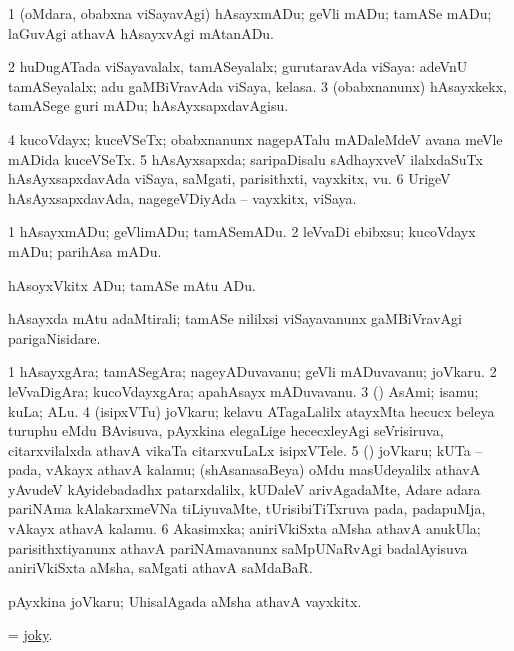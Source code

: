 \noindent
\gl{\pagu}
\bmng
\bnum
\num{1}    (oMdara, obabxna viSayavAgi) hAsayxmADu; geVli mADu; tamASe mADu; laGuvAgi athavA hAsayxvAgi mAtanADu. 
\num{2}   huDugATada viSayavalalx, tamASeyalalx; gurutaravAda viSaya:   adeVnU tamASeyalalx; adu gaMBiVravAda viSaya, kelasa. 
\num{3}  (obabxnanunx) hAsayxkekx, tamASege guri mADu; hAsAyxsapxdavAgisu. 
\num{4}   kucoVdayx; kuceVSeTx; obabxnanunx nagepATalu mADaleMdeV avana meVle mADida kuceVSeTx. 
\num{5}  hAsAyxsapxda; saripaDisalu sAdhayxveV ilalxdaSuTx hAsAyxsapxdavAda viSaya, saMgati, parisithxti, vayxkitx, \mo vu. 
\num{6}    UrigeV hAsAyxsapxdavAda, nagegeVDiyAda -- vayxkitx, viSaya. 
\enum
\emng
\eentry

\bentry
{}
\gl{\sakirx}
\bmng
\bnum
\num{1} hAsayxmADu; geVlimADu; tamASemADu. 
\num{2} leVvaDi ebibxsu; kucoVdayx mADu; parihAsa mADu. 
\enum
\emng

\noindent
\gl{\akirx}
\bmng
hAsoyxVkitx ADu; tamASe mAtu ADu. 
\emng

\noindent
\gl{\pagu}
\bmng
{} hAsayxda mAtu adaMtirali; tamASe nililxsi viSayavanunx gaMBiVravAgi parigaNisidare. 
\emng
\eentry

\bentry
{}
\gl{\nA}
\bmng
\bnum
\num{1} hAsayxgAra; tamASegAra; nageyADuvavanu; geVli mADuvavanu; joVkaru. 
\num{2} leVvaDigAra; kucoVdayxgAra; apahAsayx mADuvavanu. 
\num{3} (\ashi) AsAmi; isamu; kuLa; ALu. 
\num{4} (isipxVTu) joVkaru; kelavu ATagaLalilx atayxMta hecucx beleya turuphu eMdu BAvisuva, pAyxkina elegaLige hececxleyAgi seVrisiruva, citarxvilalxda athavA vikaTa citarxvuLaLx isipxVTele. 
\num{5} (\ame) joVkaru; kUTa -- pada, vAkayx athavA kalamu; (shAsanasaBeya) oMdu masUdeyalilx athavA yAvudeV kAyidebadadhx patarxdalilx, kUDaleV arivAgadaMte, Adare adara pariNAma kAlakarxmeVNa tiLiyuvaMte, tUrisibiTiTxruva pada, padapuMja, vAkayx athavA kalamu. 
\num{6} Akasimxka; aniriVkiSxta aMsha athavA anukUla; parisithxtiyanunx athavA pariNAmavanunx saMpUNaRvAgi badalAyisuva aniriVkiSxta aMsha, saMgati athavA saMdaBaR. 
\enum
\emng

\noindent
\gl{\nuga}
\bmng
{} pAyxkina joVkaru; UhisalAgada aMsha athavA vayxkitx. 
\emng
\eentry

\bentry
{}
\gl{\gu}
\bmng
 = \hyperlink{joky}{joky}. 
\emng
\eentry


